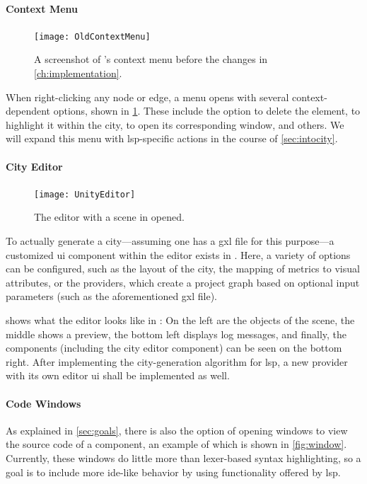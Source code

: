 \documentclass[../thesis]{subfiles}
\begin{document}
\paragraph{Context Menu}

\begin{figure}[htbp]
	\begin{center}
		\texttt{[image: OldContextMenu]}
	\end{center}
	\caption{A screenshot of \SEE{}'s context menu before the changes in \cref{ch:implementation}.}\label{fig:oldcontext}
\end{figure}

When right-clicking any node or edge, a menu opens with several context-dependent options, shown in \cref{fig:oldcontext}.
These include the option to delete the element, to highlight it within the \gls{city}, to open its corresponding \gls{window}, and others.
We will expand this menu with \gls{lsp}-specific actions in the course of \cref{sec:intocity}.

\paragraph{City Editor}

\begin{figure}[htbp]
	\begin{center}
		\texttt{[image: UnityEditor]}
	\end{center}
	\caption{The \gls*{editor} with a scene in \SEE{} opened.}\label{fig:editor}
\end{figure}

To actually generate a \gls{city}---assuming one has a \gls{gxl} file for this purpose---a customized \gls{ui} component within the \gls{editor} exists in \SEE{}.
Here, a variety of options can be configured, such as the layout of the city, the mapping of metrics to visual attributes, or the \glspl*{provider}, which create a project graph based on optional input parameters (such as the aforementioned \gls{gxl} file).

 shows what the \gls{editor} looks like in \SEE{}:
On the left are the objects of the scene, the middle shows a preview, the bottom left displays log messages, and finally, the components (including the city editor component) can be seen on the bottom right.
After implementing the city-generation algorithm for \gls{lsp}, a new \gls{provider} with its own \gls{editor} \gls{ui} shall be implemented as well.

\paragraph{Code Windows}
As explained in \cref{sec:goals}, there is also the option of opening \glspl{window} to view the source code of a component, an example of which is shown in \cref{fig:window}.
Currently, these windows do little more than lexer-based syntax highlighting, so a goal is to include more \gls{ide}-like behavior by using functionality offered by \gls{lsp}.
\end{document}
